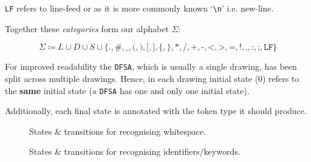 \begin{noteline}
\texttt{LF} refers to line-feed or as it is more commonly known
`\texttt{\textbackslash n}' i.e. new-line.
\end{noteline}

\pagebreak

Together these \emph{categories} form our alphabet
$\Sigma$:

$$\Sigma \coloneq L \cup D \cup S \cup
\{\texttt{.},\texttt{\#},\texttt{\_},\texttt{(},\texttt{)},\texttt{[},\texttt{]},\texttt{\{},\texttt{\}},\texttt{*},\texttt{/},\texttt{+},\texttt{-},\texttt{<},\texttt{>},\texttt{=},\texttt{!},\texttt{,},\texttt{:},\texttt{;},\texttt{LF}\}$$

For improved readability the \texttt{DFSA}, which is usually a
single drawing, has been split across multiple drawings. Hence,
in each drawing  initial state ($0$) refers to the \textbf{same}
initial state (a \texttt{DFSA} has one and only one initial
state).

Additionally, each final state is annotated with
the token type it should produce.


\label{sss:dfsadrawings}

\begin{figure}[H]
\centering
{}
\caption{States \& transitions for recognising
whitespace.}
\end{figure}

\begin{figure}[H]
\centering
{}
\caption{States \& transitions for recognising
identifiers/keywords.}
\end{figure}


